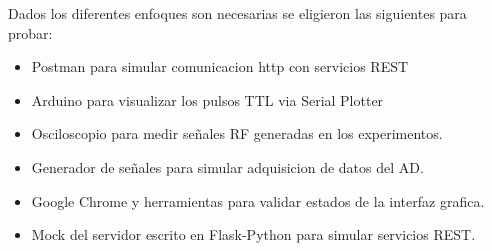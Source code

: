 Dados los diferentes enfoques son necesarias se eligieron las siguientes para probar:
\begin{itemize}
    \item Postman para simular comunicacion http con servicios REST
    \item Arduino para visualizar los pulsos TTL via Serial Plotter
    \item Osciloscopio para medir señales RF generadas en los experimentos.
    \item Generador de señales para simular adquisicion de datos del AD.
    \item Google Chrome y herramientas para validar estados de la interfaz grafica.
    \item Mock del servidor escrito en Flask-Python para simular servicios REST.
\end{itemize}
\newpage